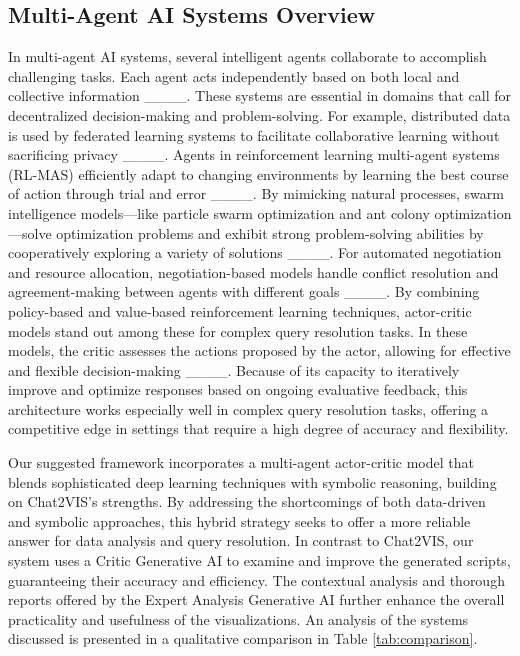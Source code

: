 \subsection{Multi-Agent AI Systems Overview} In multi-agent AI systems, several intelligent agents collaborate to accomplish challenging tasks. Each agent acts independently based on both local and collective information ____. These systems are essential in domains that call for decentralized decision-making and problem-solving. For example, distributed data is used by federated learning systems to facilitate collaborative learning without sacrificing privacy \mbox{____}. Agents in reinforcement learning multi-agent systems (RL-MAS) efficiently adapt to changing environments by learning the best course of action through trial and error \mbox{____}. By mimicking natural processes, swarm intelligence models—like particle swarm optimization and ant colony optimization—solve optimization problems and exhibit strong problem-solving abilities by cooperatively exploring a variety of solutions \mbox{____}. For automated negotiation and resource allocation, negotiation-based models handle conflict resolution and agreement-making between agents with different goals \mbox{____}. By combining policy-based and value-based reinforcement learning techniques, actor-critic models stand out among these for complex query resolution tasks. In these models, the critic assesses the actions proposed by the actor, allowing for effective and flexible decision-making \mbox{____}. Because of its capacity to iteratively improve and optimize responses based on ongoing evaluative feedback, this architecture works especially well in complex query resolution tasks, offering a competitive edge in settings that require a high degree of accuracy and flexibility.

Our suggested framework incorporates a multi-agent actor-critic model that blends sophisticated deep learning techniques with symbolic reasoning, building on Chat2VIS's strengths. By addressing the shortcomings of both data-driven and symbolic approaches, this hybrid strategy seeks to offer a more reliable answer for data analysis and query resolution. In contrast to Chat2VIS, our system uses a Critic Generative AI to examine and improve the generated scripts, guaranteeing their accuracy and efficiency. The contextual analysis and thorough reports offered by the Expert Analysis Generative AI further enhance the overall practicality and usefulness of the visualizations. An analysis of the systems discussed is presented in a qualitative comparison in Table \ref{tab:comparison}.